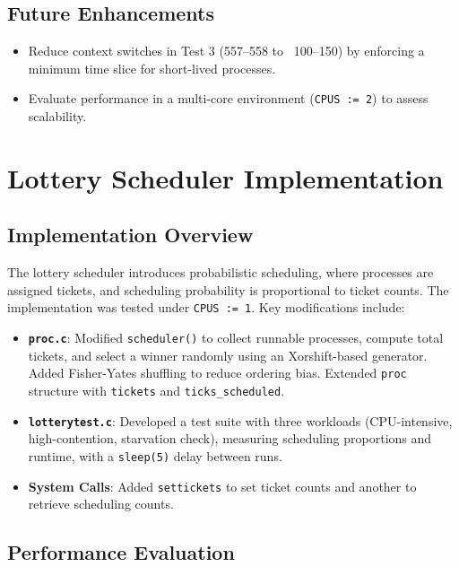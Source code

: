 \documentclass[12pt]{article}
\begin{document}
\subsection{Future Enhancements}
\label{subsec:priority-future}

\begin{itemize}
    \item Reduce context switches in Test 3 (557–558 to ~100–150) by enforcing a minimum time slice for short-lived processes.
    \item Evaluate performance in a multi-core environment (\texttt{CPUS := 2}) to assess scalability.
\end{itemize}

\section{Lottery Scheduler Implementation}
\label{sec:lottery-scheduler}

\subsection{Implementation Overview}
\label{subsec:lottery-implementation}

The lottery scheduler introduces probabilistic scheduling, where processes are assigned tickets, and scheduling probability is proportional to ticket counts. The implementation was tested under \texttt{CPUS := 1}. Key modifications include:

\begin{itemize}
    \item \textbf{\texttt{proc.c}}: Modified \texttt{scheduler()} to collect runnable processes, compute total tickets, and select a winner randomly using an Xorshift-based generator. Added Fisher-Yates shuffling to reduce ordering bias. Extended \texttt{proc} structure with \texttt{tickets} and \texttt{ticks\_scheduled}.
    \item \textbf{\texttt{lotterytest.c}}: Developed a test suite with three workloads (CPU-intensive, high-contention, starvation check), measuring scheduling proportions and runtime, with a \texttt{sleep(5)} delay between runs.
    \item \textbf{System Calls}: Added \texttt{settickets} to set ticket counts and another to retrieve scheduling counts.
\end{itemize}

\subsection{Performance Evaluation}
\label{subsec:lottery-performance}
\end{document}
